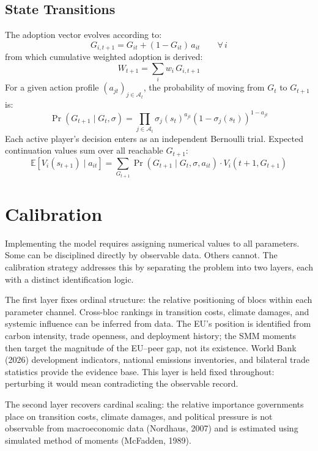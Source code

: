\documentclass[10pt,a4paper]{article}
\begin{document}
\needspace{12em}
\subsection*{State Transitions}

The adoption vector evolves according to:
\[
G_{i,t+1} = G_{it} + (1 - G_{it})\, a_{it} \qquad \forall\, i
\]
from which cumulative weighted adoption is derived:
\[
W_{t+1} = \sum_i w_i\, G_{i,t+1}
\]
For a given action profile $(a_{jt})_{j \in \mathcal{A}_t}$, the probability of moving from
$G_t$ to $G_{t+1}$ is:
\[
\Pr(G_{t+1} \mid G_t, \sigma) =
  \prod_{j \in \mathcal{A}_t} \sigma_j(s_t)^{a_{jt}} \left(1 - \sigma_j(s_t)\right)^{1-a_{jt}}
\]
Each active player's decision enters as an independent Bernoulli trial. Expected continuation
values sum over all reachable $G_{t+1}$:
\[
\mathbb{E}[V_i(s_{t+1}) \mid a_{it}] =
  \sum_{G_{t+1}} \Pr(G_{t+1} \mid G_t, \sigma, a_{it}) \cdot V_i(t+1, G_{t+1})
\]

\clearpage
\needspace{12em}
\section{Calibration}

Implementing the model requires assigning numerical values to all parameters. Some can be disciplined
directly by observable data. Others cannot. The calibration strategy addresses this by separating the
problem into two layers, each with a distinct identification logic.

The first layer fixes ordinal structure: the relative positioning of blocs within each parameter channel. Cross-bloc rankings in transition costs, climate damages, and systemic influence can be inferred from data. The EU's position is identified from carbon intensity, trade openness, and deployment history; the SMM moments then target the magnitude of the EU--peer gap, not its existence. World Bank (2026) development indicators, national emissions inventories, and bilateral trade statistics provide the evidence base. This layer is held fixed throughout: perturbing it would mean contradicting the observable record.

The second layer recovers cardinal scaling: the relative importance governments place on transition costs, climate damages, and political pressure is not observable from macroeconomic data (Nordhaus, 2007) and is estimated using simulated method of moments (McFadden, 1989).
\end{document}
